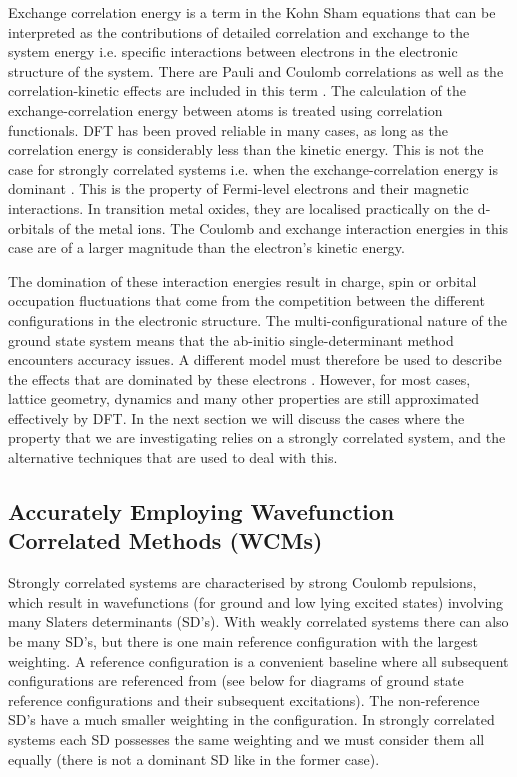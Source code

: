 \documentclass[10pt]{article}
\begin{document}
Exchange correlation energy is a term in the Kohn Sham equations that can be interpreted as the contributions of detailed correlation and exchange to the system energy i.e. specific interactions between electrons in the electronic structure of the system. There are Pauli and Coulomb correlations as well as the correlation-kinetic effects are included in this term \cite{kohn1965self,refson2006variational}. The calculation of the exchange-correlation energy between atoms is treated using correlation functionals. DFT has been proved reliable in many cases, as long as the correlation energy is considerably less than the kinetic energy. This is not the case for strongly correlated systems i.e. when the exchange-correlation energy is dominant \cite{pickett1989electronic}. This is the property of Fermi-level electrons and their magnetic interactions. In transition metal oxides, they are localised practically on the d-orbitals of the metal ions. The Coulomb and exchange interaction energies in this case are of a larger magnitude than the electron's kinetic energy.

The domination of these interaction energies result in charge, spin or orbital occupation fluctuations that come from the competition between the different configurations in the electronic structure. The multi-configurational nature of the ground state system means that the ab-initio single-determinant method encounters accuracy issues. A different model must therefore be used to describe the effects that are dominated by these electrons \cite{gelle2009accurate}. However, for most cases, lattice geometry, dynamics and many other properties are still approximated effectively by DFT. In the next section we will discuss the cases where the property that we are investigating relies on a strongly correlated system, and the alternative techniques that are used to deal with this. 

\subsection{Accurately Employing Wavefunction Correlated Methods (WCMs)}

Strongly correlated systems are characterised by strong Coulomb repulsions, which result in wavefunctions (for ground and low lying excited states) involving many Slaters determinants (SD's). With weakly correlated systems there can also be many SD's, but there is one main reference configuration with the largest weighting. A reference configuration is a convenient baseline where all subsequent configurations are referenced from (see below for diagrams of ground state reference configurations and their subsequent excitations). The non-reference SD's have a much smaller weighting in the configuration. In strongly correlated systems each SD possesses the same weighting and we must consider them all equally (there is not a dominant SD like in the former case).
\end{document}
